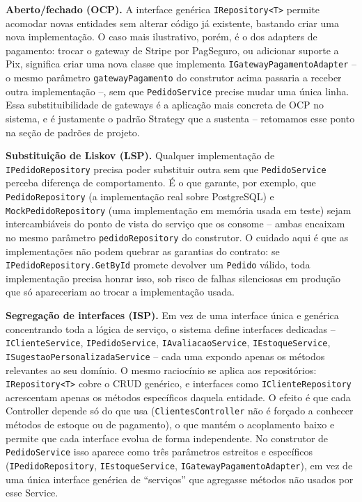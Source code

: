 \documentclass[a4paper,12pt,oneside,openany]{book}
\begin{document}
\textbf{Aberto/fechado (OCP).} A interface genérica \texttt{IRepository<T>} permite acomodar novas entidades sem alterar código já existente, bastando criar uma nova implementação. O caso mais ilustrativo, porém, é o dos adapters de pagamento: trocar o gateway de Stripe por PagSeguro, ou adicionar suporte a Pix, significa criar uma nova classe que implementa \texttt{IGatewayPagamentoAdapter} -- o mesmo parâmetro \texttt{gatewayPagamento} do construtor acima passaria a receber outra implementação --, sem que \texttt{PedidoService} precise mudar uma única linha. Essa substituibilidade de gateways é a aplicação mais concreta de OCP no sistema, e é justamente o padrão Strategy que a sustenta -- retomamos esse ponto na seção de padrões de projeto.

\textbf{Substituição de Liskov (LSP).} Qualquer implementação de \texttt{IPedidoRepository} precisa poder substituir outra sem que \texttt{PedidoService} perceba diferença de comportamento. É o que garante, por exemplo, que \texttt{PedidoRepository} (a implementação real sobre PostgreSQL) e \texttt{MockPedidoRepository} (uma implementação em memória usada em teste) sejam intercambiáveis do ponto de vista do serviço que os consome -- ambas encaixam no mesmo parâmetro \texttt{pedidoRepository} do construtor. O cuidado aqui é que as implementações não podem quebrar as garantias do contrato: se \texttt{IPedidoRepository.GetById} promete devolver um \texttt{Pedido} válido, toda implementação precisa honrar isso, sob risco de falhas silenciosas em produção que só apareceriam ao trocar a implementação usada.

\textbf{Segregação de interfaces (ISP).} Em vez de uma interface única e genérica concentrando toda a lógica de serviço, o sistema define interfaces dedicadas -- \texttt{IClienteService}, \texttt{IPedidoService}, \texttt{IAvaliacaoService}, \texttt{IEstoqueService}, \texttt{ISugestaoPersonalizadaService} -- cada uma expondo apenas os métodos relevantes ao seu domínio. O mesmo raciocínio se aplica aos repositórios: \texttt{IRepository<T>} cobre o CRUD genérico, e interfaces como \texttt{IClienteRepository} acrescentam apenas os métodos específicos daquela entidade. O efeito é que cada Controller depende só do que usa (\texttt{ClientesController} não é forçado a conhecer métodos de estoque ou de pagamento), o que mantém o acoplamento baixo e permite que cada interface evolua de forma independente. No construtor de \texttt{PedidoService} isso aparece como três parâmetros estreitos e específicos (\texttt{IPedidoRepository}, \texttt{IEstoqueService}, \texttt{IGatewayPagamentoAdapter}), em vez de uma única interface genérica de ``serviços'' que agregasse métodos não usados por esse Service.
\end{document}
